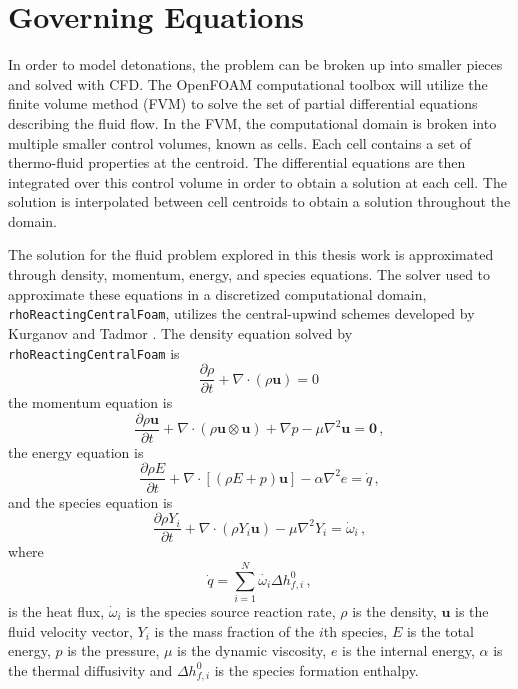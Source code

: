 \section{Governing Equations}
In order to model detonations, the problem can be broken up into smaller pieces and solved with CFD. The OpenFOAM computational toolbox will utilize the finite volume method (FVM) to solve the set of partial differential equations describing the fluid flow. In the FVM, the computational domain is broken into multiple smaller control volumes, known as cells. Each cell contains a set of thermo-fluid properties at the centroid. The differential equations are then integrated over this control volume in order to obtain a solution at each cell. The solution is interpolated between cell centroids to obtain a solution throughout the domain. 

The solution for the fluid problem explored in this thesis work is approximated through density, momentum, energy, and species equations. The solver used to approximate these equations in a discretized computational domain, \verb|rhoReactingCentralFoam|, utilizes the central-upwind schemes developed by Kurganov and Tadmor \cite{kurganov1}. The density equation solved by \verb|rhoReactingCentralFoam| is
\begin{equation}
\frac{\partial \rho}{\partial t} + \nabla \cdot \left(\rho \bm{u}\right) = 0\,
\end{equation}
the momentum equation is
\begin{equation}
\frac{\partial \rho\bm{u}}{\partial t} + \nabla \cdot \left(\rho \bm{u}\otimes \bm{u}\right) + \nabla p -\mu\nabla^2\bm{u}= \bm{0}\,,
\end{equation}
the energy equation is
\begin{equation}
\frac{\partial \rho E}{\partial t} + \nabla \cdot \left[\left(\rho E + p\right)\bm{u}\right] -\alpha\nabla^2 e = \dot{q}\,,
\end{equation}
and the species equation is
\begin{equation}
\frac{\partial \rho Y_i}{\partial t} + \nabla \cdot \left(\rho Y_i \bm{u}\right) -\mu\nabla^2 Y_i= \dot{\omega}_i\,,
\end{equation}
where 
\begin{equation}
\dot{q} = \sum_{i = 1}^N \dot{\omega_i} \Delta h_{f,i}^0\,,
\end{equation}
is the heat flux, $\dot{\omega}_i$ is the species source reaction rate, $\rho$ is the density, $\bm{u}$ is the fluid velocity vector, $Y_i$ is the mass fraction of the $i$th species, $E$ is the total energy, $p$ is the pressure, $\mu$ is the dynamic viscosity, $e$ is the internal energy, $\alpha$ is the thermal diffusivity and $\Delta h_{f,i}^0$ is the species formation enthalpy.

